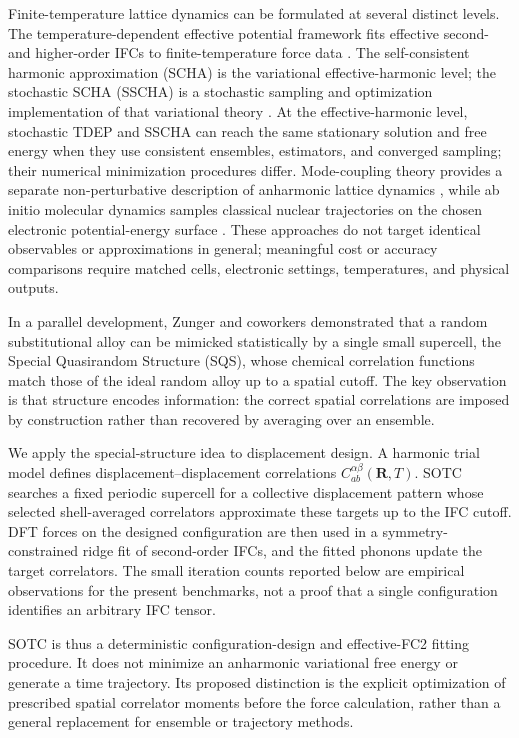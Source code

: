 \documentclass[aps,prb,reprint,amsmath,amssymb,floatfix]{revtex4-2}
\begin{document}
Finite-temperature lattice dynamics can be formulated at several distinct
levels. The temperature-dependent effective potential framework fits effective
second- and higher-order IFCs to finite-temperature force data
\cite{ref5,ref6,ref10,ref52}. The self-consistent harmonic approximation (SCHA)
is the variational effective-harmonic level; the stochastic SCHA (SSCHA) is a
stochastic sampling and optimization implementation of that variational theory
\cite{ref7,ref8,ref50}. At the effective-harmonic level, stochastic TDEP and
SSCHA can reach the same stationary solution and free energy when they use
consistent ensembles, estimators, and converged sampling; their numerical
minimization procedures differ. Mode-coupling theory provides a separate
non-perturbative description of anharmonic lattice dynamics \cite{ref51}, while
ab initio molecular dynamics samples classical nuclear trajectories on the
chosen electronic potential-energy surface \cite{ref9}. These approaches do not
target identical observables or approximations in general; meaningful cost or
accuracy comparisons require matched cells, electronic settings, temperatures,
and physical outputs.

In a parallel development, Zunger and coworkers \cite{ref12}
demonstrated that a random substitutional alloy can be mimicked
statistically by a single small supercell, the Special Quasirandom
Structure (SQS), whose chemical correlation functions match those of the
ideal random alloy up to a spatial cutoff. The key observation is that
structure encodes information: the correct spatial correlations are
imposed by construction rather than recovered by averaging over an
ensemble.

We apply the special-structure idea to displacement design. A harmonic trial
model defines displacement--displacement correlations
\(C_{ab}^{\alpha\beta}(\mathbf R,T)\). SOTC searches a fixed periodic
supercell for a collective displacement pattern whose selected shell-averaged
correlators approximate these targets up to the IFC cutoff. DFT forces on the
designed configuration are then used in a symmetry-constrained ridge fit of
second-order IFCs, and the fitted phonons update the target correlators. The
small iteration counts reported below are empirical observations for the
present benchmarks, not a proof that a single configuration identifies an
arbitrary IFC tensor.

SOTC is thus a deterministic configuration-design and effective-FC2 fitting
procedure. It does not minimize an anharmonic variational free energy or
generate a time trajectory. Its proposed distinction is the explicit
optimization of prescribed spatial correlator moments before the force
calculation, rather than a general replacement for ensemble or trajectory
methods.
\end{document}

